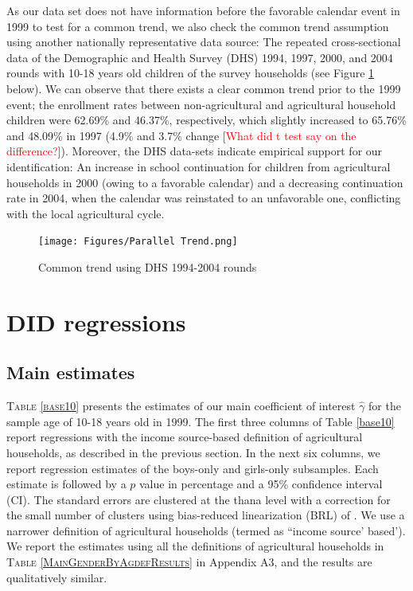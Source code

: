 \documentclass[12pt,letterpaper]{article}
\newcommand{\SAdded}[1]{\textcolor{red}{#1}}
\newcommand{\0}{\ensuremath{\mbox{\boldmath $0$}}}
\begin{document}
As our data set does not have information before the favorable calendar event in 1999 to test for a common trend, we also check the common trend assumption using another nationally representative data source: The repeated cross-sectional data of the Demographic and Health Survey (DHS) 1994, 1997, 2000, and 2004 rounds with 10-18 years old children of the survey households (see Figure \ref{ptrendDHS} below). We can observe that there exists a clear common trend prior to the 1999 event; the enrollment rates between non-agricultural and agricultural household children were 62.69\% and 46.37\%, respectively, which slightly increased to 65.76\% and 48.09\% in 1997 (4.9\% and 3.7\% change [\SAdded{What did t test say on the difference?}]). Moreover, the DHS data-sets indicate empirical support for our identification: An increase in school continuation for children from agricultural households in 2000 (owing to a favorable calendar) and a decreasing continuation rate in 2004, when the calendar was reinstated to an unfavorable one, conflicting with the local agricultural cycle. 


\begin{figure}[h!]
\centering
\texttt{[image: Figures/Parallel Trend.png]}\\
\caption{Common trend using DHS 1994-2004 rounds}
\label{ptrendDHS}
\end{figure}




\section{DID regressions}\label{sec_DID}
\subsection{Main estimates}

\textsc{\small Table \ref{base10}} presents the estimates of our main coefficient of interest $\hat{\gamma}$ for the sample age of 10-18 years old in 1999. The first three columns of Table \ref{base10} report regressions with the income source-based definition of agricultural households, as described in the previous section. In the next six columns, we report regression estimates of the boys-only and girls-only subsamples. Each estimate is followed by a $p$ value in percentage and a 95\% confidence interval (CI). The standard errors are clustered at the thana level with a correction for the small number of clusters using bias-reduced linearization (BRL) of \citet{PustejovskyTipton2018}. We use a narrower definition of agricultural households (termed as ``income source' based'). We report the estimates using all the definitions of agricultural households in \textsc{Table \ref{MainGenderByAgdefResults}} in Appendix A3, and the results are qualitatively similar. 
\end{document}
